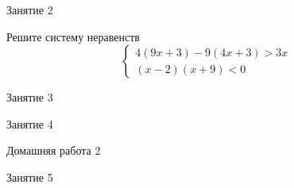 \begin{class}[number=2]
	\begin{listofex}
		\item Занятие 2
	\end{listofex}
\end{class}

\begin{homework}[number=1]
	\begin{listofex}
		\item Решите систему неравенств  
		\begin{equation*}
			\begin{cases}
				4(9x+3)-9(4x+3)>3x
				\\
				(x-2)(x+9)<0
			\end{cases}
		\end{equation*}
	\end{listofex}
\end{homework}

\begin{class}[number=3]
	\begin{listofex}
		\item Занятие 3 
	\end{listofex}
\end{class}

\begin{class}[number=4]
	\begin{listofex}
		\item Занятие 4
	\end{listofex}
\end{class}

\begin{homework}[number=2]
	\begin{listofex}
		\item Домашняя работа 2
	\end{listofex}
\end{homework}

\begin{class}[number=5]
	\begin{listofex}
		\item Занятие 5
	\end{listofex}
\end{class}

